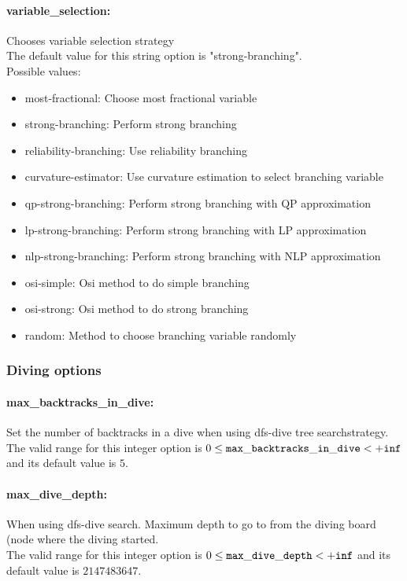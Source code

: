 \paragraph{variable\_selection:}\label{sec:variable_selection} Chooses variable selection strategy $\;$ \\
The default value for this string option is "strong-branching".
\\ 
Possible values:
\begin{itemize}
   \item most-fractional: Choose most fractional variable
   \item strong-branching: Perform strong branching
   \item reliability-branching: Use reliability branching
   \item curvature-estimator: Use curvature estimation to select branching
variable
   \item qp-strong-branching: Perform strong branching with QP approximation
   \item lp-strong-branching: Perform strong branching with LP approximation
   \item nlp-strong-branching: Perform strong branching with NLP approximation
   \item osi-simple: Osi method to do simple branching
   \item osi-strong: Osi method to do strong branching
   \item random: Method to choose branching variable randomly
\end{itemize}

\subsubsection{Diving options}
\label{sec:Diving_options}

\paragraph{max\_backtracks\_in\_dive:}\label{sec:max_backtracks_in_dive} Set the number of backtracks in a dive when using dfs-dive tree searchstrategy. $\;$ \\
 The valid range for this integer option is
$0 \le {\tt max\_backtracks\_in\_dive } <  {\tt +inf}$
and its default value is $5$.


\paragraph{max\_dive\_depth:}\label{sec:max_dive_depth} When using dfs-dive search. Maximum depth to go to from the diving board (node where the diving started. $\;$ \\
 The valid range for this integer option is
$0 \le {\tt max\_dive\_depth } <  {\tt +inf}$
and its default value is $2147483647$.


